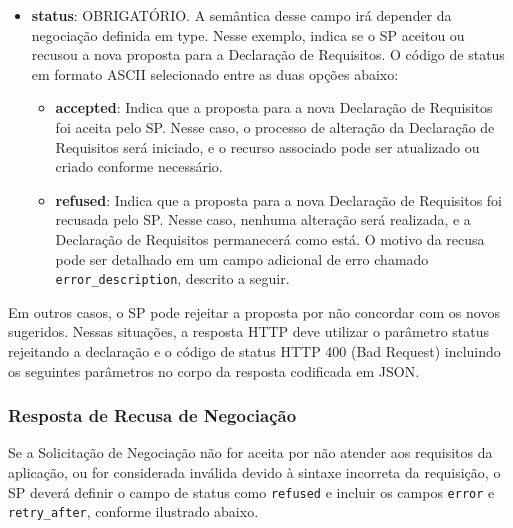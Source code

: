 

\begin{itemize}
    
   \item \textbf{status}: OBRIGATÓRIO. A semântica desse campo irá depender da negociação definida em type. Nesse exemplo, indica se o \acs{SP} aceitou ou recusou a nova proposta para a Declaração de Requisitos. O código de status em formato ASCII selecionado entre as duas opções abaixo:

    \begin{itemize}
        \item \textbf{accepted}: Indica que a proposta para a nova Declaração de Requisitos foi aceita pelo \acs{SP}. Nesse caso, o processo de alteração da Declaração de Requisitos será iniciado, e o recurso associado pode ser atualizado ou criado conforme necessário.
        
        \item \textbf{refused}: Indica que a proposta para a nova Declaração de Requisitos foi recusada pelo \acs{SP}. Nesse caso, nenhuma alteração será realizada, e a Declaração de Requisitos permanecerá como está. O motivo da recusa pode ser detalhado em um campo adicional de erro chamado \texttt{error\_description}, descrito a seguir.
    \end{itemize}

\end{itemize}

Em outros casos, o \acs{SP} pode rejeitar a proposta por não concordar com os novos sugeridos. Nessas situações, a resposta HTTP deve utilizar o parâmetro status rejeitando a declaração e o código de status HTTP 400 (Bad Request) incluindo os seguintes parâmetros no corpo da resposta codificada em JSON.

\subsubsection*{Resposta de Recusa de Negociação}\label{subsubsection:response-negotiation-error}

Se a Solicitação de Negociação não for aceita por não atender aos requisitos da aplicação, ou for considerada inválida devido à sintaxe incorreta da requisição, o SP deverá definir o campo de status como \texttt{refused} e incluir os campos \texttt{error} e \texttt{retry\_after}, conforme ilustrado abaixo.



